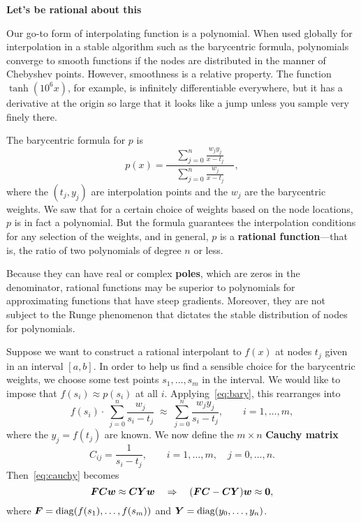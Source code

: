 \documentclass[11pt,twoside]{article}
\begin{document}
   
\begin{center}
    \bf Let's be rational about this
\end{center}

Our go-to form of interpolating function is a polynomial. When used globally for interpolation in a stable algorithm such as the barycentric formula, polynomials converge to smooth functions if the nodes are distributed in the manner of Chebyshev points. However, smoothness is a relative property. The function $\tanh(10^6 x)$, for example, is infinitely differentiable everywhere, but it has a derivative at the origin so large that it looks like a jump unless you sample very finely there. 

The barycentric formula for $p$ is 
\begin{equation}
  \label{eq:bary}
  p(x) = \dfrac{\displaystyle \quad \sum_{j=0}^{n} \frac{w_j y_j}{x-t_j} \quad}{\displaystyle\sum_{j=0}^{n} \frac{w_j}{x-t_j}},
\end{equation}
where the $(t_j,y_j)$ are interpolation points and the $w_j$ are the barycentric weights. We saw that for a certain choice of weights based on the node locations, $p$ is in fact a polynomial. But the formula guarantees the interpolation conditions for any selection of the weights, and in general, $p$ is a \textbf{rational function}---that is, the ratio of two polynomials of degree $n$ or less. 

Because they can have real or complex \textbf{poles}, which are zeros in the denominator, rational functions may be superior to polynomials for approximating functions that have steep gradients. Moreover, they are not subject to the Runge phenomenon that dictates the stable distribution of nodes for polynomials. 

Suppose we want to construct a rational interpolant to $f(x)$ at nodes $t_j$ given in an interval $[a,b]$. In order to help us find a sensible choice for the barycentric weights, we choose some test points $s_1,\dots, s_m$ in the interval. We would like to impose that $f(s_i) \approx p(s_i)$ at all $i$. Applying~\eqref{eq:bary}, this rearranges into
\begin{equation}
  \label{eq:cleared}
  f(s_i) \cdot\: \displaystyle\sum_{j=0}^{n} \frac{w_j}{s_i - t_j} \; \approx \; \displaystyle\sum_{j=0}^{n} \frac{w_j y_j}{s_i - t_j}, \qquad i=1,\ldots,m,
\end{equation}
where the $y_j=f(t_j)$ are known. We now define the $m\times n$ \textbf{Cauchy matrix}
\begin{equation}
  \label{eq:cauchy}
  C_{ij} = \frac{1}{s_i - t_j}, \qquad i=1,\ldots,m, \quad j=0,\ldots,n.
\end{equation}
Then~\eqref{eq:cauchy} becomes
\begin{equation}
  \label{eq:cauchy2}
  \bm{F} \bm{C} \bm{w} \approx \bm{C} \bm{Y} \bm{w} \quad \Rightarrow \quad (\bm{F}\bm{C} - \bm{C} \bm{Y})  \bm{w} \approx \bm{0},
\end{equation}
where $\bm{F}=\operatorname{diag}(f(s_1),\ldots,f(s_m))$ and $\bm{Y}=\operatorname{diag}(y_0,\ldots,y_{n})$. 
\end{document}
